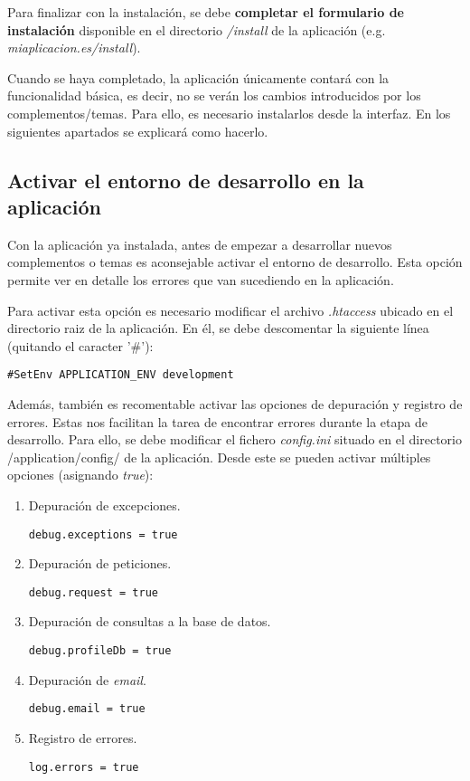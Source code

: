Para finalizar con la instalación, se debe \textbf{completar el
formulario de instalación} disponible en el directorio \emph{/install} de la
aplicación (e.g. \emph{miaplicacion.es/install}). 
 
Cuando se haya completado, la aplicación únicamente contará con la funcionalidad
básica, es decir, no se verán los cambios introducidos por los
complementos/temas. Para ello, es necesario instalarlos desde la
interfaz. En los siguientes apartados se explicará como hacerlo.

\subsection{Activar el entorno de desarrollo en la aplicación}

Con la aplicación ya instalada, antes de empezar a desarrollar nuevos complementos
o temas es aconsejable activar el entorno de desarrollo. Esta opción permite
ver en detalle los errores que van sucediendo en la aplicación.

Para activar esta opción es necesario modificar el archivo \emph{.htaccess} 
ubicado en el directorio raiz de la aplicación. En él, se debe descomentar la 
siguiente línea (quitando el caracter '\#'):
\begin{verbatim}
#SetEnv APPLICATION_ENV development
\end{verbatim}

Además, también es recomentable activar las opciones de depuración y registro de errores. 
Estas nos facilitan la tarea de encontrar errores durante la etapa de desarrollo. Para ello, se debe modificar el fichero \emph{config.ini} situado en el directorio {/application/config/} de la aplicación. Desde este se pueden activar múltiples opciones (asignando \emph{true}):

\begin{enumerate}
\def\labelenumi{\arabic{enumi}.}
\tightlist
\item
  Depuración de excepciones.
\begin{verbatim}
debug.exceptions = true
\end{verbatim}
\item
  Depuración de peticiones.
  \begin{verbatim}
debug.request = true
\end{verbatim}
\item
  Depuración de consultas a la base de datos.
  \begin{verbatim}
debug.profileDb = true
\end{verbatim}
\item
  Depuración de \emph{email}.
  \begin{verbatim}
debug.email = true
\end{verbatim}  
\item
  Registro de errores. 
  \begin{verbatim}
log.errors = true
\end{verbatim}  
\end{enumerate}

